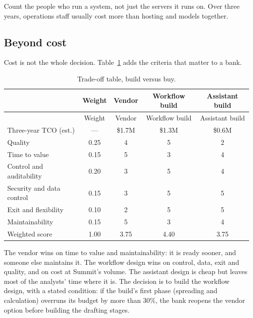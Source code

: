 \begin{keyidea}
Count the people who run a system, not just the servers it runs on. Over three years, operations staff usually cost more than hosting and models together.
\end{keyidea}

\subsection{Beyond cost}

Cost is not the whole decision. Table~\ref{tab:loan-tradeoff} adds the criteria that matter to a bank.

\begingroup
\small
\begin{longtable}{@{}lcccc@{}}
\caption{Trade-off table, build versus buy.}\label{tab:loan-tradeoff}\\
\toprule
\rowcolor{coHead} & Weight & Vendor & Workflow build & Assistant build \\
\midrule
\endfirsthead
\toprule
\rowcolor{coHead} & Weight & Vendor & Workflow build & Assistant build \\
\midrule
\endhead
Three-year TCO (est.) & --- & \$1.7M & \$1.3M & \$0.6M \\
\midrule
Quality & 0.25 & 4 & 5 & 2 \\
Time to value & 0.15 & 5 & 3 & 4 \\
Control and auditability & 0.20 & 3 & 5 & 4 \\
Security and data control & 0.15 & 3 & 5 & 5 \\
Exit and flexibility & 0.10 & 2 & 5 & 5 \\
Maintainability & 0.15 & 5 & 3 & 4 \\
\midrule
\rowcolor{coAmberBg} Weighted score & 1.00 & 3.75 & 4.40 & 3.75 \\
\bottomrule
\end{longtable}
\endgroup

The vendor wins on time to value and maintainability: it is ready sooner, and someone else maintains it. The workflow design wins on control, data, exit and quality, and on cost at Summit's volume. The assistant design is cheap but leaves most of the analysts' time where it is. The decision is to build the workflow design, with a stated condition: if the build's first phase (spreading and calculation) overruns its budget by more than 30\%, the bank reopens the vendor option before building the drafting stages.
